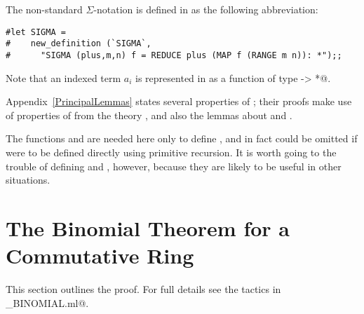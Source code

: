 The non-standard $\Sigma$-notation is defined in \HOL{} as the following
abbreviation:
\begin{session}
\begin{verbatim}
#let SIGMA =
#    new_definition (`SIGMA`,
#      "SIGMA (plus,m,n) f = REDUCE plus (MAP f (RANGE m n)): *");;
\end{verbatim}
\end{session}
Note that an indexed term $a_i$ is represented in \HOL{} as a function
\verb@f@ of type \verb@num -> *@.

Appendix~\ref{PrincipalLemmas} states several properties of \verb@SIGMA@; 
their proofs make use of properties of \verb@MAP@ from the theory 
\verb@list@, and also the lemmas about \verb@REDUCE@ and \verb@RANGE@.

The functions \verb@REDUCE@ and \verb@RANGE@ are needed here only to define 
\verb@SIGMA@, and in fact could be omitted if \verb@SIGMA@ were to be defined 
directly  using primitive recursion.  It is worth going to the trouble 
of defining \verb@REDUCE@ and \verb@RANGE@, however, because they are likely 
to be useful in other situations. 


\section{The Binomial Theorem for a Commutative Ring}
\label{BinomialTheorem}

This section outlines the proof.  For full details see the tactics in
\verb@mk_BINOMIAL.ml@.

